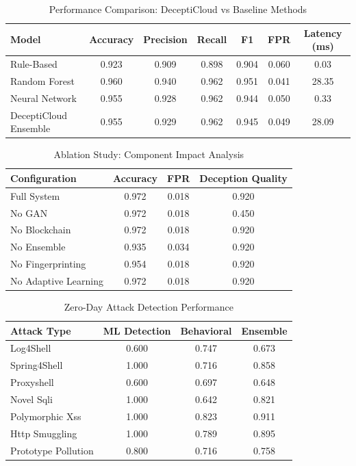 \begin{table}[htbp]
\centering
\caption{Performance Comparison: DeceptiCloud vs Baseline Methods}
\label{tab:baseline_comparison}
\begin{tabular}{lcccccc}
\toprule
Model & Accuracy & Precision & Recall & F1 & FPR & Latency (ms) \\
\midrule
Rule-Based & 0.923 & 0.909 & 0.898 & 0.904 & 0.060 & 0.03 \\
Random Forest & 0.960 & 0.940 & 0.962 & 0.951 & 0.041 & 28.35 \\
Neural Network & 0.955 & 0.928 & 0.962 & 0.944 & 0.050 & 0.33 \\
DeceptiCloud Ensemble & 0.955 & 0.929 & 0.962 & 0.945 & 0.049 & 28.09 \\
\bottomrule
\end{tabular}
\end{table}

\begin{table}[htbp]
\centering
\caption{Ablation Study: Component Impact Analysis}
\label{tab:ablation_study}
\begin{tabular}{lccc}
\toprule
Configuration & Accuracy & FPR & Deception Quality \\
\midrule
Full System & 0.972 & 0.018 & 0.920 \\
No GAN & 0.972 & 0.018 & 0.450 \\
No Blockchain & 0.972 & 0.018 & 0.920 \\
No Ensemble & 0.935 & 0.034 & 0.920 \\
No Fingerprinting & 0.954 & 0.018 & 0.920 \\
No Adaptive Learning & 0.972 & 0.018 & 0.920 \\
\bottomrule
\end{tabular}
\end{table}

\begin{table}[htbp]
\centering
\caption{Zero-Day Attack Detection Performance}
\label{tab:zero_day}
\begin{tabular}{lccc}
\toprule
Attack Type & ML Detection & Behavioral & Ensemble \\
\midrule
Log4Shell & 0.600 & 0.747 & 0.673 \\
Spring4Shell & 1.000 & 0.716 & 0.858 \\
Proxyshell & 0.600 & 0.697 & 0.648 \\
Novel Sqli & 1.000 & 0.642 & 0.821 \\
Polymorphic Xss & 1.000 & 0.823 & 0.911 \\
Http Smuggling & 1.000 & 0.789 & 0.895 \\
Prototype Pollution & 0.800 & 0.716 & 0.758 \\
\bottomrule
\end{tabular}
\end{table}
